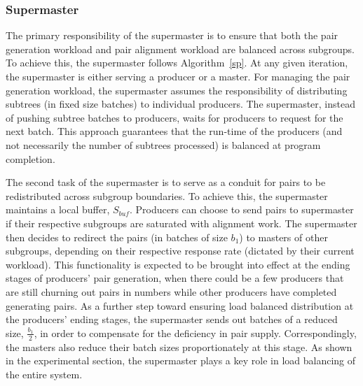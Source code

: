 \documentclass[10pt,journal,letterpaper,compsoc]{IEEEtran}
\begin{document}
\subsubsection{Supermaster }
\label{secSupermaster}

The primary responsibility of the supermaster is to ensure that both the pair generation workload and pair alignment workload are balanced across subgroups. To achieve this, the supermaster follows Algorithm~\ref{sp}. At any given iteration, the supermaster is either serving a producer or a master. For managing the pair generation workload, the supermaster assumes the responsibility of distributing subtrees (in fixed size batches) to individual producers. The supermaster, instead of pushing subtree batches to producers, waits for producers to request for the next batch. This approach guarantees that the run-time of the producers (and not necessarily the number of subtrees processed) is balanced at program completion. 

The second task of the supermaster is to serve as a conduit for pairs to be redistributed across subgroup boundaries. To achieve this, the supermaster maintains a local buffer, $S_{buf}$. Producers can choose to send pairs to supermaster if their respective subgroups are saturated with alignment work. The supermaster then decides to redirect the pairs (in batches of size $b_1$) to masters of other subgroups, depending on their respective response rate (dictated by their current workload). This functionality is expected to be brought into effect at the ending stages of producers' pair generation, when there could be a few producers that are still churning out pairs in numbers while other producers have completed generating pairs. As a further step toward ensuring load balanced distribution at the producers' ending stages, the supermaster sends out batches of a reduced size, $\frac{b_1}{2}$, in order to compensate for the deficiency in pair supply. Correspondingly, the masters also reduce their batch sizes proportionately at this stage. As shown in the experimental section, the supermaster plays a key role in load balancing of the entire system.
\end{document}
